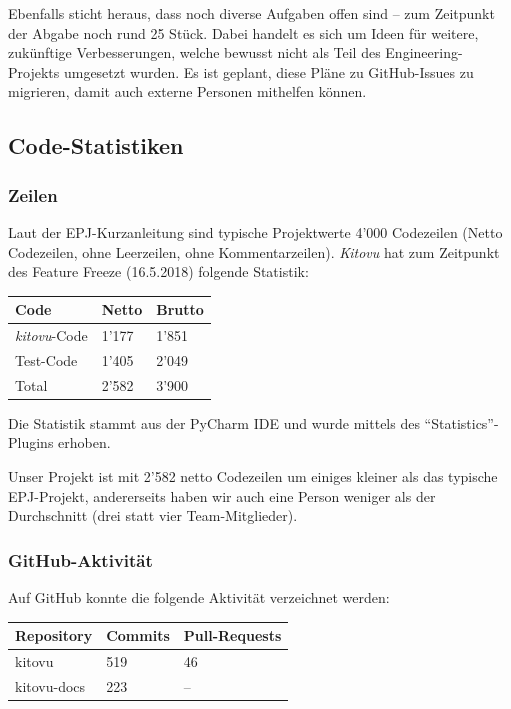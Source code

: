 \documentclass[a4paper]{article}
\begin{document}
Ebenfalls sticht heraus, dass noch diverse Aufgaben offen sind -- zum Zeitpunkt
der Abgabe noch rund 25 Stück. Dabei handelt es sich um Ideen für weitere, zukünftige
Verbesserungen, welche bewusst nicht als Teil des
Engineering-Projekts umgesetzt wurden. Es ist geplant, diese Pläne zu
GitHub-Issues zu migrieren, damit auch externe Personen mithelfen können.

\subsection{Code-Statistiken}

\subsubsection{Zeilen}

Laut der EPJ-Kurzanleitung sind typische Projektwerte 4'000 Codezeilen (Netto Codezeilen, ohne Leerzeilen, ohne Kommentarzeilen). \emph{Kitovu} hat zum Zeitpunkt des Feature Freeze (16.5.2018) folgende Statistik:

\begin{tabulary}{\linewidth}{lll}
  \toprule
  \textbf{Code} & \textbf{Netto} & \textbf{Brutto} \\
  \midrule
  \emph{kitovu}-Code & 1'177 & 1'851 \\
  Test-Code & 1'405 & 2'049 \\
  \midrule
  Total & 2'582 & 3'900 \\
  \bottomrule
\end{tabulary}

Die Statistik stammt aus der PyCharm IDE und wurde mittels des ``Statistics''-Plugins erhoben.

Unser Projekt ist mit 2'582 netto Codezeilen um einiges kleiner als das typische EPJ-Projekt, andererseits haben wir auch eine Person weniger als der Durchschnitt (drei statt vier Team-Mitglieder).

\subsubsection{GitHub-Aktivität}

Auf GitHub konnte die folgende Aktivität verzeichnet werden:

\begin{tabulary}{\linewidth}{lll}
  \toprule
  \textbf{Repository} & \textbf{Commits} & \textbf{Pull-Requests} \\
  \midrule
  kitovu & 519 & 46 \\
  kitovu-docs & 223 & -- \\
  \bottomrule
\end{tabulary}
\end{document}
